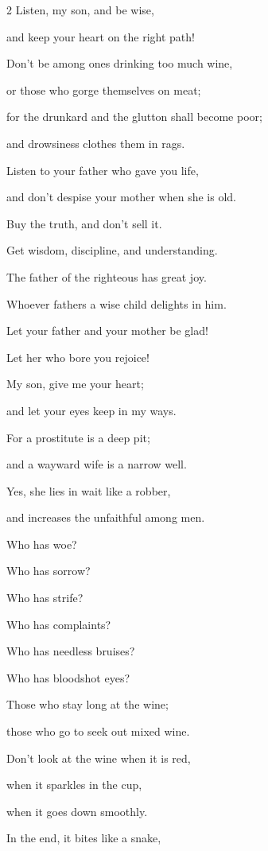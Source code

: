 \begin{multicols}{2}
\myverse{}Listen, my son, and be wise,

and keep your heart on the right path!


\myverse{}Don’t be among ones drinking too much wine,

or those who gorge themselves on meat;


\myverse{}for the drunkard and the glutton shall become poor;

and drowsiness clothes them in rags.


\myverse{}Listen to your father who gave you life,

and don’t despise your mother when she is old.


\myverse{}Buy the truth, and don’t sell it.

Get wisdom, discipline, and understanding.


\myverse{}The father of the righteous has great joy.

Whoever fathers a wise child delights in him.


\myverse{}Let your father and your mother be glad!

Let her who bore you rejoice!


\myverse{}My son, give me your heart;

and let your eyes keep in my ways.


\myverse{}For a prostitute is a deep pit;

and a wayward wife is a narrow well.


\myverse{}Yes, she lies in wait like a robber,

and increases the unfaithful among men.


\vspace{\baselineskip} 
\myverse{}Who has woe?

Who has sorrow?

Who has strife?

Who has complaints?

Who has needless bruises?

Who has bloodshot eyes?


\myverse{}Those who stay long at the wine;

those who go to seek out mixed wine.


\myverse{}Don’t look at the wine when it is red,

when it sparkles in the cup,

when it goes down smoothly.


\myverse{}In the end, it bites like a snake,


\end{multicols}
